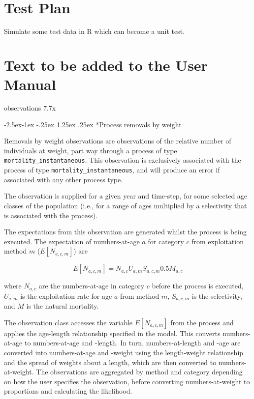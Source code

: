\documentclass[a4paper,11pt,twoside,pdftex,draft]{article}
\makeatletter
\renewcommand\paragraph{\@startsection{paragraph}{4}{\z@}%
{-2.5ex\@plus -1ex \@minus -.25ex}%
{1.25ex \@plus .25ex}%
{\normalfont\normalsize\bfseries}}
\makeatother
\begin{document}
\section{Test Plan}

Simulate some test data in R which can become a unit test.

\section{Text to be added to the User Manual}

observations 7.7x

\paragraph*{Process removals by weight}

Removals by weight observations are observations of the relative number of individuals at weight, part way through a process of type \texttt{mortality\_instantaneous}. This observation is exclusively associated with the process of type \texttt{mortality\_instantaneous}, and will produce an error if associated with any other process type.

The observation is supplied for a given year and time-step, for some selected age classes of the population (i.e., for a range of ages multiplied by a selectivity that is associated with the process).

The expectations from this observation are generated whilst the process is being executed. The expectation of numbers-at-age $a$ for category $c$ from exploitation method $m$ ($E[N_{a,c,m}]$) are

\begin{equation}
E[N_{a,c,m}] = N_{a,c} U_{a,m} S_{a,c,m} 0.5 M_{a,c}
\end{equation}

where $N_{a,c}$ are the numbers-at-age in category $c$ before the process is executed, $U_{a,m}$ is the exploitation rate for age $a$ from method $m$, $S_{a,c,m}$ is the selectivity, and $M$ is the natural mortality.

The observation class accesses the variable $E[N_{a,c,m}]$ from the process and applies the age-length relationship specified in the model. This converts numbers-at-age to numbers-at-age and -length. In turn, numbers-at-length and -age are converted into numbers-at-age and -weight using the length-weight relationship and the spread of weights about a length, which are then converted to numbers-at-weight.  The observations are aggregated by method and category depending on how the user specifies the observation, before converting numbers-at-weight to proportions and calculating the likelihood.
\end{document}

